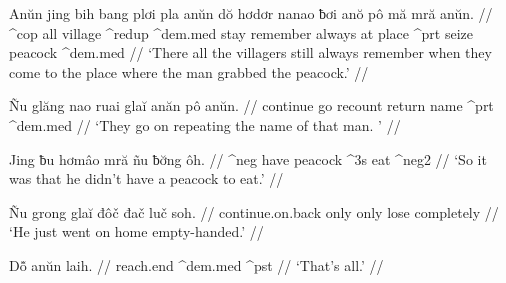 \gla Anŭn jing {bih bang} plơi pla anŭn dŏ hơdơr nanao ƀơi anŏ pô mă mră anŭn. //
 {\sc^cop} all village {\sc^redup} {\sc^dem.med} stay remember always at place {\sc^prt} seize peacock {\sc^dem.med} //
\glft `There all the villagers still always remember when they come to the place where the man grabbed the peacock.' //


\gla Ñu glăng nao ruai glaĭ anăn pô anŭn. //
 continue go recount return name {\sc^prt} {\sc^dem.med} //
\glft `They go on repeating the name of that man. ' //


\gla Jing ƀu hơmâo mră ñu ƀơ̆ng ôh. //
 {\sc^neg} have peacock {\sc^3s} eat {\sc^neg2} //
\glft `So it was that he didn't have a peacock to eat.' //


\gla Ñu {grong glaĭ} đôč đač luč soh. //
 continue.on.back only only lose completely //
\glft `He just went on home empty-handed.' //


\gla Dô̆ anŭn laih. //
\glb reach.end {\sc^dem.med} {\sc^pst} //
\glft `That's all.' //

